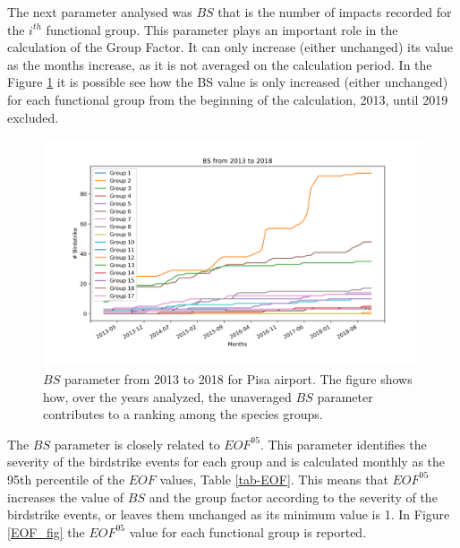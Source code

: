The next parameter analysed was $BS$ that is the number of impacts recorded for the $i^{th}$ functional group. This parameter plays an important role in the calculation of the Group Factor. It can only increase (either unchanged) its value as the months increase, as it is not averaged on the calculation period. In the Figure \ref{BS_fig} it is possible see how the BS value is only increased (either unchanged) for each functional group from the beginning of the calculation, 2013, until 2019 excluded.

\begin{figure}
	\centering
	\includegraphics[width=13cm]{img/BS.png}
	\caption{$BS$ parameter from 2013 to 2018 for Pisa airport. The figure shows how, over the years analyzed, the unaveraged $BS$ parameter contributes to a ranking among the species groups.}
	\label{BS_fig}
\end{figure}

The $BS$ parameter is closely related to $EOF^{95}$. This parameter identifies the severity of the birdstrike events for each group and is calculated monthly as the 95th percentile of the $EOF$ values, Table \ref{tab-EOF}. This means that $EOF^{95}$ increases the value of $BS$ and the group factor according to the severity of the birdstrike events, or leaves them unchanged as its minimum value is 1. In Figure \ref{EOF_fig} the $EOF^{95}$ value for each functional group is reported.

